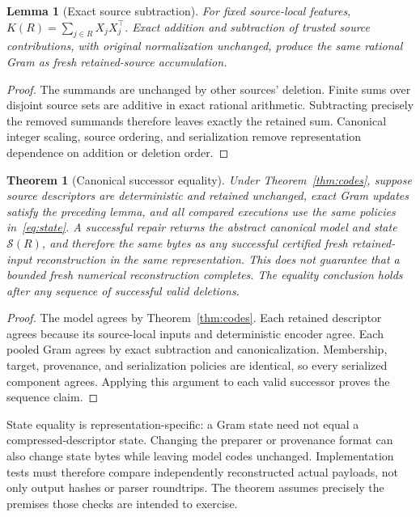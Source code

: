 \documentclass[10pt,twocolumn,letterpaper]{article}
\newtheorem{theorem}{Theorem}
\newtheorem{lemma}{Lemma}
\newcommand{\calS}{\mathcal{S}}
\begin{document}
\begin{lemma}[Exact source subtraction]
For fixed source-local features, $K(R)=\sum_{j\in R}X_jX_j^\top$. Exact addition and
subtraction of trusted source contributions, with original normalization
unchanged, produce the same rational Gram as fresh retained-source accumulation.
\end{lemma}
\begin{proof}
The summands are unchanged by other sources' deletion. Finite sums over disjoint
source sets are additive in exact rational arithmetic. Subtracting precisely the
removed summands therefore leaves exactly the retained sum. Canonical integer
scaling, source ordering, and serialization remove representation dependence on
addition or deletion order.
\end{proof}

\begin{theorem}[Canonical successor equality]
\label{thm:state}
Under Theorem~\ref{thm:codes}, suppose source descriptors are deterministic and
retained unchanged, exact Gram updates satisfy the preceding lemma, and all
compared executions use the same policies in~\eqref{eq:state}. A successful repair
returns the abstract canonical model and state $\calS(R)$, and therefore the same
bytes as any successful certified fresh retained-input reconstruction in the
same representation. This does not guarantee that a bounded fresh numerical
reconstruction completes. The equality conclusion holds after any
sequence of successful valid deletions.
\end{theorem}
\begin{proof}
The model agrees by Theorem~\ref{thm:codes}. Each retained descriptor agrees because
its source-local inputs and deterministic encoder agree. Each pooled Gram agrees
by exact subtraction and canonicalization. Membership, target, provenance, and
serialization policies are identical, so every serialized component agrees.
Applying this argument to each valid successor proves the sequence claim.
\end{proof}

State equality is representation-specific: a Gram state need not equal a
compressed-descriptor state. Changing the preparer or provenance format can also
change state bytes while leaving model codes unchanged. Implementation tests must
therefore compare independently reconstructed actual payloads, not only output
hashes or parser roundtrips. The theorem assumes precisely the premises those
checks are intended to exercise.
\end{document}
